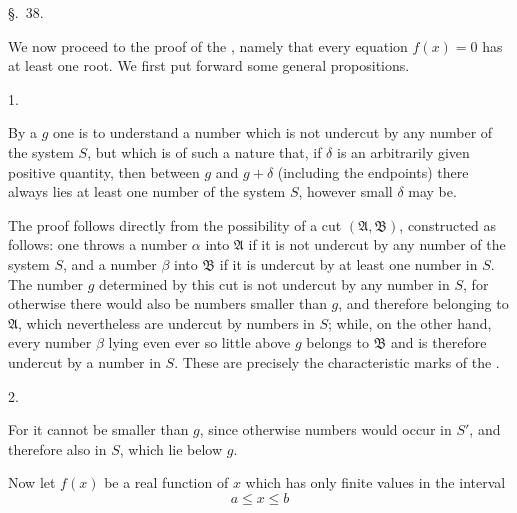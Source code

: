 
\begin{center}
{\large \S.\ 38.}

\vspace{0.5em}
{\large{}}
\end{center}

We now proceed to the proof of the , namely that every equation $f(x)=0$ has at least one root. We first put forward some general propositions.

1. 

By a  $g$ one is to understand a number which is not undercut by any number of the system $S$, but which is of such a nature that, if $\delta$ is an arbitrarily given positive quantity, then between $g$ and $g+\delta$ (including the endpoints) there always lies at least one number of the system $S$, however small $\delta$ may be.

The proof follows directly from the possibility of a cut $(\mathfrak A,\mathfrak B)$, constructed as follows: one throws a number $\alpha$ into $\mathfrak A$ if it is not undercut by any number of the system $S$, and a number $\beta$ into $\mathfrak B$ if it is undercut by at least one number in $S$. The number $g$ determined by this cut is not undercut by any number in $S$, for otherwise there would also be numbers smaller than $g$, and therefore belonging to $\mathfrak A$, which nevertheless are undercut by numbers in $S$; while, on the other hand, every number $\beta$ lying even ever so little above $g$ belongs to $\mathfrak B$ and is therefore undercut by a number in $S$. These are precisely the characteristic marks of the .

2. 

For it cannot be smaller than $g$, since otherwise numbers would occur in $S'$, and therefore also in $S$, which lie below $g$.

Now let $f(x)$ be a real function of $x$ which has only finite values in the interval
\begin{equation}
 a\le x\le b
\tag{1}
\end{equation}
